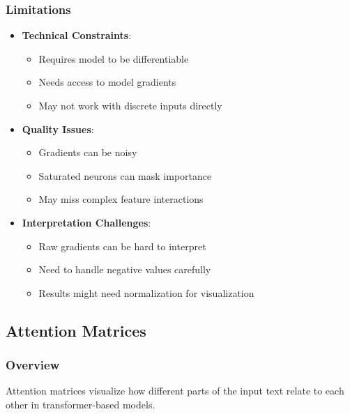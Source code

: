 \documentclass{article}
\begin{document}
\subsubsection{Limitations}
\begin{itemize}
    \item \textbf{Technical Constraints}:
        \begin{itemize}
            \item Requires model to be differentiable
            \item Needs access to model gradients
            \item May not work with discrete inputs directly
        \end{itemize}
    \item \textbf{Quality Issues}:
        \begin{itemize}
            \item Gradients can be noisy
            \item Saturated neurons can mask importance
            \item May miss complex feature interactions
        \end{itemize}
    \item \textbf{Interpretation Challenges}:
        \begin{itemize}
            \item Raw gradients can be hard to interpret
            \item Need to handle negative values carefully
            \item Results might need normalization for visualization
        \end{itemize}
\end{itemize}

\subsection{Attention Matrices}

\subsubsection{Overview}
Attention matrices visualize how different parts of the input text relate to each other in transformer-based models.
\end{document}
